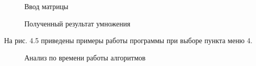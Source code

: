 \documentclass[12pt]{report}
\begin{document}
\begin{figure}[h]
	\caption{Ввод матрицы}
	\label{figure:image}
\end{figure}

\begin{figure}[h]
	\caption{Полученный результат умножения}
	\label{figure:image}
\end{figure}

\newpage
На рис. 4.5 приведены примеры работы программы при выборе пункта меню 4.

\begin{figure}[h]
	\caption{Анализ по времени работы алгоритмов}
	\label{figure:image}
\end{figure}
 
\end{document}
